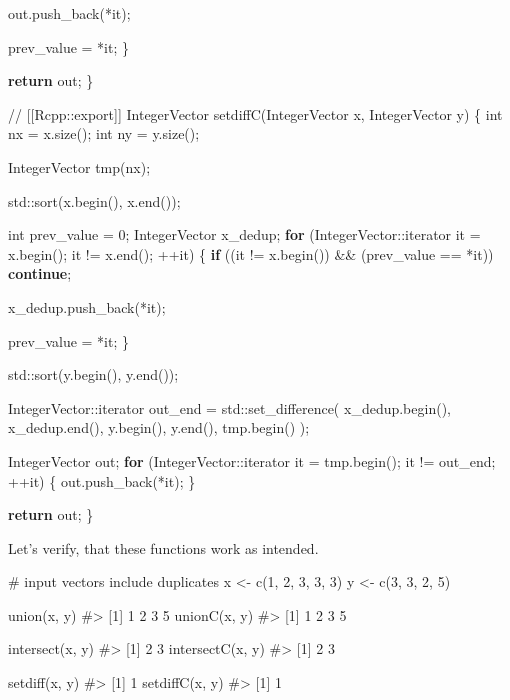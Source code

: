 \documentclass[
]{krantz}
\makeatletter
\newenvironment{Shaded}{\begin{snugshade}}{\end{snugshade}}
\newcommand{\BuiltInTok}[1]{#1}
\newcommand{\CommentTok}[1]{\textcolor[rgb]{0.56,0.35,0.01}{\textit{#1}}}
\newcommand{\ControlFlowTok}[1]{\textcolor[rgb]{0.13,0.29,0.53}{\textbf{#1}}}
\newcommand{\DataTypeTok}[1]{\textcolor[rgb]{0.13,0.29,0.53}{#1}}
\newcommand{\DecValTok}[1]{\textcolor[rgb]{0.00,0.00,0.81}{#1}}
\newcommand{\KeywordTok}[1]{\textcolor[rgb]{0.13,0.29,0.53}{\textbf{#1}}}
\newcommand{\NormalTok}[1]{#1}
\newcommand{\StringTok}[1]{\textcolor[rgb]{0.31,0.60,0.02}{#1}}
\newenvironment{kframe}{%
\medskip{}
\setlength{\fboxsep}{.8em}
 \def\at@end@of@kframe{}%
 \ifinner\ifhmode%
  \def\at@end@of@kframe{\end{minipage}}%
  \begin{minipage}{\columnwidth}%
 \fi\fi%
 \def\FrameCommand##1{\hskip\@totalleftmargin \hskip-\fboxsep
 \colorbox{shadecolor}{##1}\hskip-\fboxsep
     \hskip-\linewidth \hskip-\@totalleftmargin \hskip\columnwidth}%
 \MakeFramed {\advance\hsize-\width
   \@totalleftmargin\z@ \linewidth\hsize
   \@setminipage}}%
 {\par\unskip\endMakeFramed%
 \at@end@of@kframe}
\renewenvironment{Shaded}{\begin{kframe}}{\end{kframe}}
\renewcommand{\KeywordTok} [1]{\textcolor[rgb]{0.00,0.44,0.13}{{#1}}}
\renewcommand{\DataTypeTok}[1]{\textcolor[rgb]{0.56,0.13,0.00}{{#1}}}
\renewcommand{\DecValTok}  [1]{\textcolor[rgb]{0.25,0.63,0.44}{{#1}}}
\renewcommand{\StringTok}  [1]{\textcolor[rgb]{0.25,0.44,0.63}{{#1}}}
\renewcommand{\CommentTok} [1]{\textcolor[rgb]{0.38,0.63,0.69}{{#1}}}
\renewcommand{\NormalTok}  [1]{{#1}}
\makeatother
\begin{document}
\begin{Shaded}
\begin{Highlighting}[]
\NormalTok{    out.push_back(*it);}
    
\NormalTok{    prev_value = *it;}
\NormalTok{  \}}
  
  \ControlFlowTok{return}\NormalTok{ out;}
\NormalTok{\}}

\CommentTok{// [[Rcpp::export]]}
\NormalTok{IntegerVector setdiffC(IntegerVector x, IntegerVector y) \{}
  \DataTypeTok{int}\NormalTok{ nx = x.size();}
  \DataTypeTok{int}\NormalTok{ ny = y.size();}
  
\NormalTok{  IntegerVector tmp(nx);}
  
  \BuiltInTok{std::}\NormalTok{sort(x.begin(), x.end());}
  
  \DataTypeTok{int}\NormalTok{ prev_value = }\DecValTok{0}\NormalTok{;}
\NormalTok{  IntegerVector x_dedup;}
  \ControlFlowTok{for}\NormalTok{ (IntegerVector::iterator it = x.begin();}
\NormalTok{       it != x.end(); ++it) \{}
    \ControlFlowTok{if}\NormalTok{ ((it != x.begin()) && (prev_value == *it)) }\ControlFlowTok{continue}\NormalTok{;}
    
\NormalTok{    x_dedup.push_back(*it);}
    
\NormalTok{    prev_value = *it;}
\NormalTok{  \}}
  
  \BuiltInTok{std::}\NormalTok{sort(y.begin(), y.end());}
  
\NormalTok{  IntegerVector::iterator out_end = }\BuiltInTok{std::}\NormalTok{set_difference(}
\NormalTok{    x_dedup.begin(), x_dedup.end(), y.begin(), y.end(), tmp.begin()}
\NormalTok{  );}
  
\NormalTok{  IntegerVector out;}
  \ControlFlowTok{for}\NormalTok{ (IntegerVector::iterator it = tmp.begin();}
\NormalTok{       it != out_end; ++it) \{}
\NormalTok{    out.push_back(*it);}
\NormalTok{  \}}
  
  \ControlFlowTok{return}\NormalTok{ out;}
\NormalTok{\}}
\end{Highlighting}
\end{Shaded}

Let's verify, that these functions work as intended.

\begin{Shaded}
\begin{Highlighting}[]
\CommentTok{# input vectors include duplicates}
\NormalTok{x <-}\StringTok{ }\KeywordTok{c}\NormalTok{(}\DecValTok{1}\NormalTok{, }\DecValTok{2}\NormalTok{, }\DecValTok{3}\NormalTok{, }\DecValTok{3}\NormalTok{, }\DecValTok{3}\NormalTok{)}
\NormalTok{y <-}\StringTok{ }\KeywordTok{c}\NormalTok{(}\DecValTok{3}\NormalTok{, }\DecValTok{3}\NormalTok{, }\DecValTok{2}\NormalTok{, }\DecValTok{5}\NormalTok{)}

\KeywordTok{union}\NormalTok{(x, y)}
\CommentTok{#> [1] 1 2 3 5}
\KeywordTok{unionC}\NormalTok{(x, y)}
\CommentTok{#> [1] 1 2 3 5}

\KeywordTok{intersect}\NormalTok{(x, y)}
\CommentTok{#> [1] 2 3}
\KeywordTok{intersectC}\NormalTok{(x, y)}
\CommentTok{#> [1] 2 3}

\KeywordTok{setdiff}\NormalTok{(x, y)}
\CommentTok{#> [1] 1}
\KeywordTok{setdiffC}\NormalTok{(x, y)}
\CommentTok{#> [1] 1}
\end{Highlighting}
\end{Shaded}

  

\backmatter
\printindex
\end{document}

